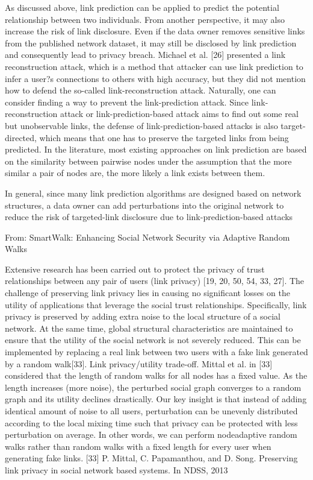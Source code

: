 As discussed above, link prediction can be applied to predict the potential relationship between two individuals. From another perspective, it may also increase the risk of link disclosure. Even if the data owner removes sensitive links from the published network dataset, it may still be disclosed by link prediction and consequently lead to privacy breach. Michael et al. [26] presented a link reconstruction attack, which is a method that attacker can use link prediction to infer a user?s connections to others with high accuracy, but they did not mention how to defend the so-called link-reconstruction attack. Naturally, one can consider finding a way to prevent the link-prediction attack. Since link-reconstruction attack or link-prediction-based attack aims to find out some real but unobservable links, the defense of link-prediction-based attacks is also target-directed, which means that one has to preserve the targeted links from being predicted. In the literature, most existing approaches on link prediction are based on the similarity between pairwise nodes under the assumption that the more similar a pair of nodes are, the more likely a link exists between them.

In general, since many link prediction algorithms are designed based on network structures, a data owner can add perturbations into the original
network to reduce the risk of targeted-link disclosure due to link-prediction-based attacks


From: SmartWalk: Enhancing Social Network Security via Adaptive Random Walks

Extensive research has been carried out to protect the privacy of trust relationships between any pair of users (link privacy) [19, 20, 50, 54, 33, 27]. The challenge of preserving link privacy lies in causing no significant losses on the utility of applications that leverage the social trust relationships. Specifically, link privacy is preserved by adding extra noise to the local structure of a social network. At the same time, global structural characteristics are maintained to ensure
that the utility of the social network is not severely reduced. This can be implemented by replacing a real link between two users with a fake link generated by a random walk[33]. Link privacy/utility trade-off. Mittal et al. in [33] considered that the length of random walks for all nodes has a fixed value. As the length increases (more noise), the
perturbed social graph converges to a random graph and its utility declines drastically. Our key insight is that instead of adding identical amount of noise to all users, perturbation can be unevenly distributed according to the local mixing time such that privacy can be protected with less perturbation on average. In other words, we can perform nodeadaptive random walks rather than random walks with a fixed length for every user when generating fake links.
[33] P. Mittal, C. Papamanthou, and D. Song. Preserving link privacy in social network based systems. In NDSS, 2013




